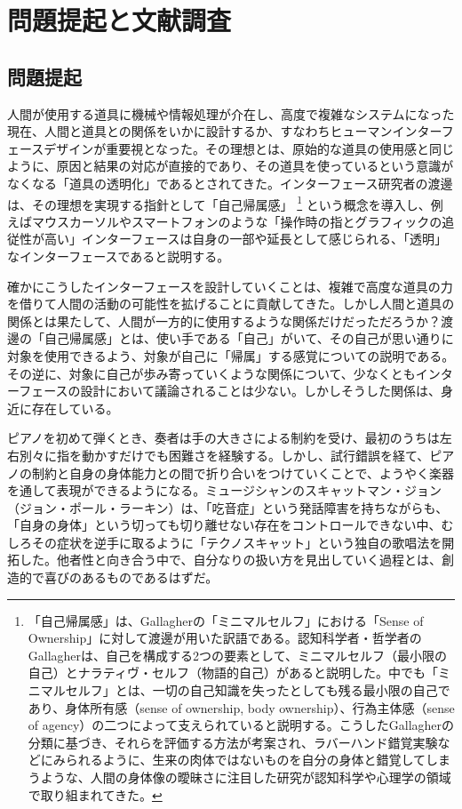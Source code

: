 \chapter{問題提起と文献調査}
\label{related_works}

\section{問題提起}
\label{subject}
人間が使用する道具に機械や情報処理が介在し、高度で複雑なシステムになった現在、人間と道具との関係をいかに設計するか、すなわちヒューマンインターフェースデザインが重要視となった。その理想とは、原始的な道具の使用感と同じように、原因と結果の対応が直接的であり、その道具を使っているという意識がなくなる「道具の透明化」であるとされてきた\cite{Watanabe2017}。インターフェース研究者の渡邊は、その理想を実現する指針として「自己帰属感」
\footnote{「自己帰属感」は、Gallagherの「ミニマルセルフ」における「Sense of Ownership」に対して渡邊が用いた訳語である\cite{Watanabe2017}。認知科学者・哲学者のGallagherは、自己を構成する2つの要素として、ミニマルセルフ（最小限の自己）とナラティヴ・セルフ（物語的自己）があると説明した\cite{Gallagher2000}。中でも「ミニマルセルフ」とは、一切の自己知識を失ったとしても残る最小限の自己であり、身体所有感（sense of ownership, body ownership）、行為主体感（sense of agency）の二つによって支えられていると説明する。こうしたGallagherの分類に基づき、それらを評価する方法が考案され、ラバーハンド錯覚実験などにみられるように、生来の肉体ではないものを自分の身体と錯覚してしまうような、人間の身体像の曖昧さに注目した研究が認知科学や心理学の領域で取り組まれてきた。}
という概念を導入し、例えばマウスカーソルやスマートフォンのような「操作時の指とグラフィックの追従性が高い」インターフェースは自身の一部や延長として感じられる、「透明」なインターフェースであると説明する。

確かにこうしたインターフェースを設計していくことは、複雑で高度な道具の力を借りて人間の活動の可能性を拡げることに貢献してきた。しかし人間と道具の関係とは果たして、人間が一方的に使用するような関係だけだっただろうか？渡邊の「自己帰属感」とは、使い手である「自己」がいて、その自己が思い通りに対象を使用できるよう、対象が自己に「帰属」する感覚についての説明である。その逆に、対象に自己が歩み寄っていくような関係について、少なくともインターフェースの設計において議論されることは少ない。しかしそうした関係は、身近に存在している。

ピアノを初めて弾くとき、奏者は手の大きさによる制約を受け、最初のうちは左右別々に指を動かすだけでも困難さを経験する。しかし、試行錯誤を経て、ピアノの制約と自身の身体能力との間で折り合いをつけていくことで、ようやく楽器を通して表現ができるようになる。ミュージシャンのスキャットマン・ジョン（ジョン・ポール・ラーキン）は、「吃音症」という発話障害を持ちながらも、「自身の身体」という切っても切り離せない存在をコントロールできない中、むしろその症状を逆手に取るように「テクノスキャット」という独自の歌唱法を開拓した。他者性と向き合う中で、自分なりの扱い方を見出していく過程とは、創造的で喜びのあるものであるはずだ。

